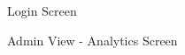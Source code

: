 \documentclass[12pt, titlepage]{article}
\begin{document}
\begin{figure}[hp!]
\begin{center}
    \caption{Login Screen}
    \label{fig:login}
    \end{center}
\end{figure}

\begin{figure}[hp!]
\begin{center}
    \caption{Admin View - Analytics Screen}
    \label{fig:analytics}
    \end{center}
\end{figure}
\end{document}
